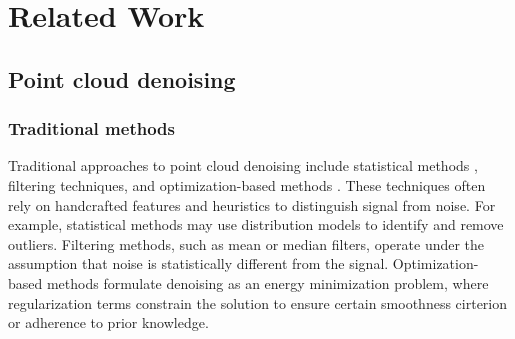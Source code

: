 \section{Related Work}
\label{sec:related work}
\subsection{Point cloud denoising}

    \subsubsection{Traditional methods}
Traditional approaches to point cloud denoising include statistical methods \cite{computingpointset2003,definingpointset2004,wlop2009HH}, filtering techniques\cite{pointsetsurfaces2001,Robustmoving2005, zaman2017density}, and optimization-based methods \cite{l1sparse2010,clop2014PR,digne2017bilateral,multi-projection2018duan,hu2020featuregraph} . These techniques often rely on handcrafted features and heuristics to distinguish signal from noise. For example, statistical methods may use distribution models to identify and remove outliers. Filtering methods, such as mean or median filters, operate under the assumption that noise is statistically different from the signal. Optimization-based methods formulate denoising as an energy minimization problem, where regularization terms constrain the solution to ensure certain smoothness cirterion or adherence to prior knowledge.


